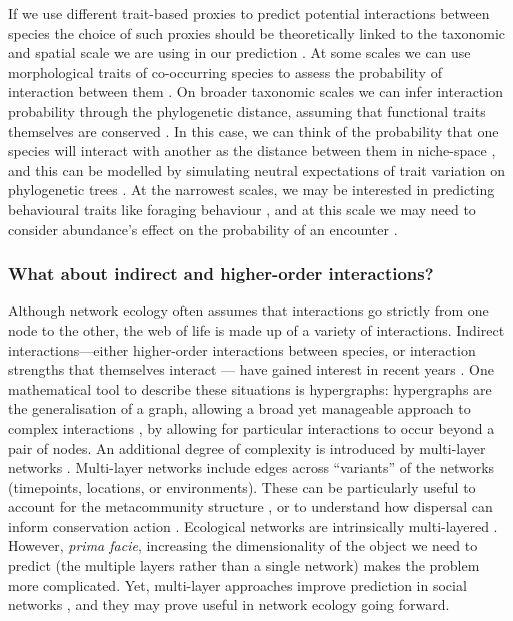 If we use different trait-based proxies to predict potential
interactions between species the choice of such proxies should be
theoretically linked to the taxonomic and spatial scale we are using in
our prediction \cite{Wiens1989SpaSca}. At some scales we can use
morphological traits of co-occurring species to assess the probability
of interaction between them \cite{Bartomeus2016ComFra}. On broader
taxonomic scales we can infer interaction probability through the
phylogenetic distance, assuming that functional traits themselves are
conserved \cite{Gomez2010EcoInt}. In this case, we can think of the
probability that one species will interact with another as the distance
between them in niche-space \cite{Desjardins-Proulx2017EcoInt}, and this
can be modelled by simulating neutral expectations of trait variation on
phylogenetic trees \cite{Davies2021EcoRed}. At the narrowest scales, we
may be interested in predicting behavioural traits like foraging
behaviour \cite{Bartomeus2016ComFra}, and at this scale we may need to
consider abundance's effect on the probability of an encounter
\cite{Wells2013SpeInt}.

\subsubsection{What about indirect and higher-order
interactions?}\label{what-about-indirect-and-higher-order-interactions}

Although network ecology often assumes that interactions go strictly
from one node to the other, the web of life is made up of a variety of
interactions. Indirect interactions---either higher-order interactions
between species, or interaction strengths that themselves interact ---
have gained interest in recent years \cite{Golubski2016EcoNet,
Golubski2011ModMod}. One mathematical tool to describe these
situations is hypergraphs: hypergraphs are the generalisation of a
graph, allowing a broad yet manageable approach to complex interactions
\cite{Carletti2020DynSys}, by allowing for particular interactions to
occur beyond a pair of nodes. An additional degree of complexity is
introduced by multi-layer networks \cite{Hutchinson2019SeeFor}.
Multi-layer networks include edges across ``variants'' of the networks
(timepoints, locations, or environments). These can be particularly
useful to account for the metacommunity structure
\cite{Gross2020ModMod}, or to understand how dispersal can inform
conservation action \cite{Albert2017AppNet}. Ecological networks are
intrinsically multi-layered \cite{Pilosof2017MulNat}. However,
\emph{prima facie}, increasing the dimensionality of the object we need
to predict (the multiple layers rather than a single network) makes the
problem more complicated. Yet, multi-layer approaches improve prediction
in social networks \cite{Jalili2017LinPre, Najari2019LinPre,
Yasami2018NovMul}, and they may prove useful in network ecology going
forward.

